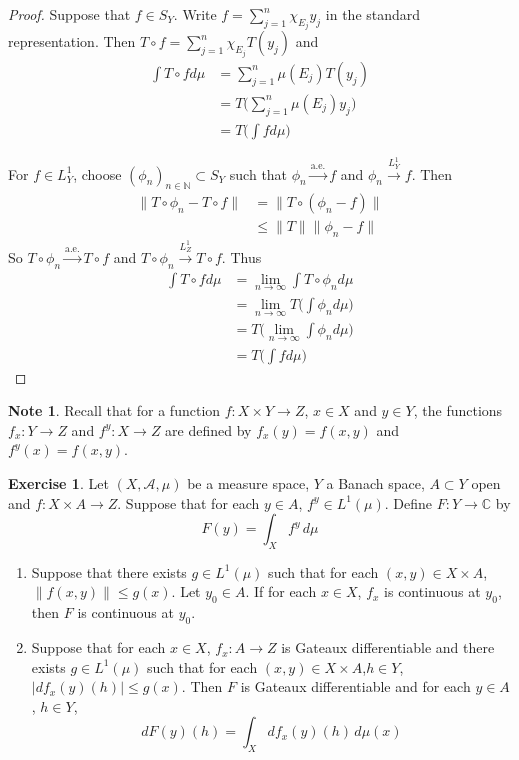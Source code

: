 \documentclass[12pt]{amsart}
\theoremstyle{definition}
\newtheorem{note}[definition]{Note}
\newtheorem{ex}[definition]{Exercise}
\newcommand{\C}{\mathbb{C}}
\newcommand{\N}{\mathbb{N}}
\newcommand{\MA}{\mathcal{A}}
\newcommand{\dmu}{\, d \mu}
\newcommand{\limn}{\lim \limits_{n \rightarrow \infty}}
\newcommand{\convt}[1]{\xrightarrow{\text{#1}}}
\newcommand{\conv}[1]{\xrightarrow{#1}}
\newcommand{\lex}[1]{\label{ex:#1}}
\begin{document}
	\begin{proof}
	Suppose that $f \in S_Y$. Write $f = \sum\limits_{j=1}^n \chi_{E_j}y_j $ in the standard representation. Then $T \circ f = \sum\limits_{j=1}^n \chi_{E_j}T(y_j)$  and 
	\begin{align*}
	\int T \circ f d \mu 
	&= \sum\limits_{j=1}^n \mu(E_j)T(y_j) \\
	&= T \bigg(\sum\limits_{j=1}^n \mu(E_j)y_j \bigg) \\
	&= T \bigg( \int f d\mu \bigg)
	\end{align*}
	
	For $f \in L^1_Y$, choose $(\phi_n)_{n \in \N} \subset S_Y$ such that $\phi_n \convt{a.e.} f$ and $\phi_n \conv{L^1_Y} f$. Then 
	\begin{align*}
	\|T \circ \phi_n - T \circ f\| 
	&= \|T \circ (\phi_n - f)\| \\
	& \leq \|T\| \|\phi_n - f\|
	\end{align*}
	So $T \circ \phi_n \convt{a.e.} T \circ f$ and $T \circ \phi_n \conv{L^1_Z} T \circ f $. Thus 
	\begin{align*}
	\int T \circ f d\mu 
	&= \limn \int T \circ \phi_n d\mu \\
	&= \limn T \bigg( \int \phi_n d\mu \bigg) \\
	&= T \bigg( \limn \int \phi_n d\mu \bigg) \\
	&= T \bigg( \int f d\mu  \bigg)
	\end{align*}
	\end{proof}
	
	\begin{note}
	Recall that for a function $f:X \times Y \rightarrow Z$, $x \in X$ and $y \in Y$, the functions $f_x:Y \rightarrow Z$ and $f^y:X \rightarrow Z$ are defined by $f_x(y) = f(x,y)$ and $f^y(x) = f(x,y)$.
	\end{note}
	
	\begin{ex} \lex{00000} 
	Let $(X, \MA, \mu)$ be a measure space,  $Y$ a Banach space, $A \subset Y$ open and $f:X \times A \rightarrow Z$. Suppose that for each $y \in A$, $f^y \in L^1(\mu)$. Define $F: Y \rightarrow \C$ by 
	$$F(y) = \int_X f^y \dmu $$ 
	\begin{enumerate}
	\item Suppose that there exists $g \in L^1(\mu)$ such that for each $(x, y) \in X \times A$, $\|f(x,y)\| \leq g(x)$. Let $y_0 \in A$. If for each $x \in X$, $f_x$ is continuous at $y_0$, then $F$ is continuous at $y_0$. 
 	\item Suppose that for each $x \in X$, $f_x:A \rightarrow Z$ is Gateaux differentiable and there exists $g \in L^1(\mu)$ such that for each $(x, y) \in X \times A$,$h \in Y$,  $| df_x(y)(h) | \leq g(x)$. Then $F$ is Gateaux differentiable and for each $y \in A$, $h \in Y$, $$dF(y)(h) = \int_X df_x(y)(h) \dmu(x)$$
	\end{enumerate}
	\end{ex}
	
\end{document}
